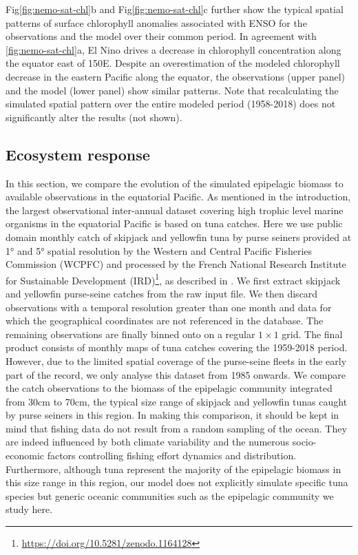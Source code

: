 Fig\ref{fig:nemo-sat-chl}b and Fig\ref{fig:nemo-sat-chl}c further show the typical spatial patterns of surface chlorophyll anomalies associated with ENSO for the observations and the model over their common period. In agreement with \ref{fig:nemo-sat-chl}a, El Nino drives a decrease in chlorophyll concentration along the equator east of 150\degree{}E. Despite an overestimation of the modeled chlorophyll decrease in the eastern Pacific along the equator, the observations (upper panel) and the model (lower panel) show similar patterns. Note that recalculating the simulated spatial pattern over the entire modeled period (1958-2018) does not significantly alter the results (not shown). 

\subsection{Ecosystem response}

In this section, we compare the evolution of the simulated epipelagic biomass to available observations in the equatorial Pacific. As mentioned in the introduction, the largest observational inter-annual dataset covering high trophic level marine organisms in the equatorial Pacific is based on tuna catches. Here we use public domain monthly catch of skipjack and yellowfin tuna by purse seiners provided at 1° and 5° spatial resolution by the Western and Central Pacific Fisheries Commission (WCPFC) and processed by the French National Research Institute for Sustainable Development (IRD)\footnote{\url{https://doi.org/10.5281/zenodo.1164128}}, as described in  \citep{taconetGlobalMonthlyCatch2018}. We first extract skipjack and yellowfin purse-seine catches from the raw input file. We then discard observations with a temporal resolution greater than one month and data for which the geographical coordinates are not referenced in the database. The remaining observations are finally binned onto on a regular $1 \times 1$ grid. The final product consists of monthly maps of tuna catches covering the 1959-2018 period. However, due to the limited spatial coverage of the purse-seine fleets in the early part of the record, we only analyse this dataset from 1985 onwards. We compare the catch observations to the biomass of the epipelagic community integrated from 30cm to 70cm, the typical size range of  skipjack and yellowfin tunas caught by purse seiners in this region. In making this comparison, it should be kept in mind that fishing data do not result from a random sampling of the ocean. They are indeed influenced by both climate variability and the numerous socio-economic factors controlling fishing effort dynamics and distribution. Furthermore, although tuna represent the majority of the epipelagic biomass in this size range in this region, our model does not explicitly simulate specific tuna species but generic oceanic communities such as the epipelagic community we study here.

